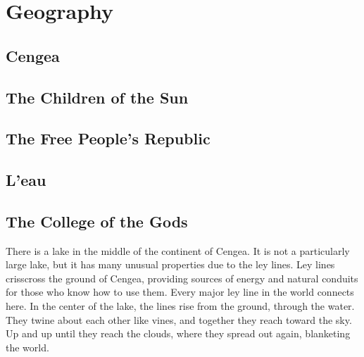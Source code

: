 \documentclass[blue]{GL2020}
\begin{document}

\section*{Geography}
\subsection*{Cengea}
\subsection*{The Children of the Sun}
\subsection*{The Free People's Republic}
\subsection*{L'eau}
\subsection*{The College of the Gods}
There is a lake in the middle of the continent of Cengea. It is not a particularly large lake, but it has many unusual properties due to the ley lines. Ley lines crisscross the ground of Cengea, providing sources of energy and natural conduits for those who know how to use them. Every major ley line in the world connects here. In the center of the lake, the lines rise from the ground, through the water. They twine about each other like vines, and together they reach toward the sky. Up and up until they reach the clouds, where they spread out again, blanketing the world.
\end{document}
